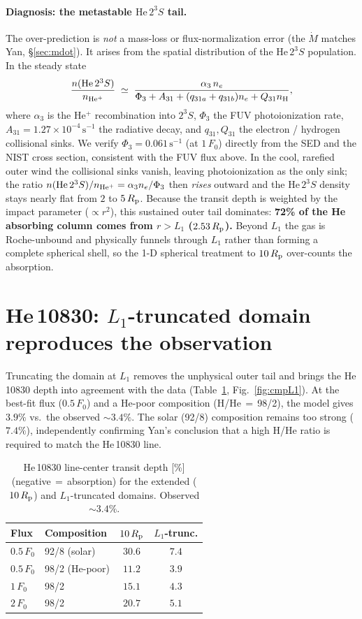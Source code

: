 \documentclass[english,a4paper]{kiseon_memo}
\newcommand{\Rp}{R_{\rm p}}
\newcommand{\Mdot}{\dot{M}}
\newcommand{\Fo}{F_{0}}
\newcommand{\HeTS}{\mathrm{He}\,2^{3}S}
\begin{document}
\paragraph{Diagnosis: the metastable $\HeTS$ tail.}
The over-prediction is \emph{not} a mass-loss or flux-normalization error (the
$\Mdot$ matches Yan, \S\ref{sec:mdot}). It arises from the spatial distribution of
the $\HeTS$ population. In the steady state
\begin{equation}
\frac{n(\HeTS)}{n_{\rm He^+}} \;\simeq\; \frac{\alpha_3\,n_e}{\Phi_3 + A_{31}
   + (q_{31a}+q_{31b})n_e + Q_{31}n_{\rm H}},
\end{equation}
where $\alpha_3$ is the He$^+$ recombination into $2^3S$, $\Phi_3$ the FUV
photoionization rate, $A_{31}=1.27\times10^{-4}\,\mathrm{s^{-1}}$ the radiative
decay, and $q_{31},Q_{31}$ the electron / hydrogen collisional sinks. We verify
$\Phi_3=0.061\,\mathrm{s^{-1}}$ (at $1\,\Fo$) directly from the SED and the NIST
cross section, consistent with the FUV flux above. In the cool, rarefied outer wind
the collisional sinks vanish, leaving photoionization as the only sink; the ratio
$n(\HeTS)/n_{\rm He^+}=\alpha_3 n_e/\Phi_3$ then \emph{rises} outward and the
$\HeTS$ density stays nearly flat from $2$ to $5\,\Rp$. Because the transit depth is
weighted by the impact parameter ($\propto r^2$), this sustained outer tail
dominates: \textbf{72\% of the He absorbing column comes from $r>L_1$ ($2.53\,\Rp$).}
Beyond $L_1$ the gas is Roche-unbound and physically funnels through $L_1$ rather
than forming a complete spherical shell, so the 1-D spherical treatment to
$10\,\Rp$ over-counts the absorption.

\section{He\,10830: $L_1$-truncated domain reproduces the observation}
\label{sec:heL1}
Truncating the domain at $L_1$ removes the unphysical outer tail and brings the
He\,10830 depth into agreement with the data (Table~\ref{tab:hedepth},
Fig.~\ref{fig:cmpL1}). At the best-fit flux ($0.5\,\Fo$) and a He-poor composition
(H/He\,$=$\,98/2), the model gives $3.9\%$ vs.\ the observed $\sim\!3.4\%$. The solar
(92/8) composition remains too strong ($7.4\%$), independently confirming Yan's
conclusion that a high H/He ratio is required to match the He\,10830 line.

\begin{table}[h]
\centering
\caption{He\,10830 line-center transit depth [\%] (negative\,$=$\,absorption) for
the extended ($10\,\Rp$) and $L_1$-truncated domains. Observed $\sim\!3.4\%$.}
\label{tab:hedepth}
\begin{tabular}{llcc}
\toprule
Flux & Composition & $10\,\Rp$ & $L_1$-trunc. \\
\midrule
$0.5\,\Fo$ & 92/8 (solar)   & $30.6$ & $7.4$ \\
$0.5\,\Fo$ & 98/2 (He-poor) & $11.2$ & $\mathbf{3.9}$ \\
$1\,\Fo$   & 98/2           & $15.1$ & $4.3$ \\
$2\,\Fo$   & 98/2           & $20.7$ & $5.1$ \\
\bottomrule
\end{tabular}
\end{table}
\end{document}
